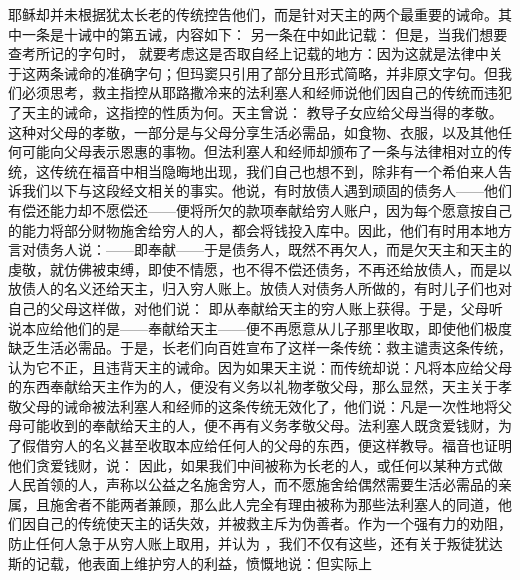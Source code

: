 耶稣却并未根据犹太长老的传统控告他们，而是针对天主的两个最重要的诫命。其中一条是十诫中的第五诫，内容如下： 另一条在中如此记载： 但是，当我们想要查考所记的字句时， 就要考虑这是否取自经上记载的地方：因为这就是法律中关于这两条诫命的准确字句；但玛窦只引用了部分且形式简略，并非原文字句。但我们必须思考，救主指控从耶路撒冷来的法利塞人和经师说他们因自己的传统而违犯了天主的诫命，这指控的性质为何。天主曾说： 教导子女应给父母当得的孝敬。这种对父母的孝敬，一部分是与父母分享生活必需品，如食物、衣服，以及其他任何可能向父母表示恩惠的事物。但法利塞人和经师却颁布了一条与法律相对立的传统，这传统在福音中相当隐晦地出现，我们自己也想不到，除非有一个希伯来人告诉我们以下与这段经文相关的事实。他说，有时放债人遇到顽固的债务人——他们有偿还能力却不愿偿还——便将所欠的款项奉献给穷人账户，因为每个愿意按自己的能力将部分财物施舍给穷人的人，都会将钱投入库中。因此，他们有时用本地方言对债务人说：——即奉献——于是债务人，既然不再欠人，而是欠天主和天主的虔敬，就仿佛被束缚，即使不情愿，也不得不偿还债务，不再还给放债人，而是以放债人的名义还给天主，归入穷人账上。放债人对债务人所做的，有时儿子们也对自己的父母这样做，对他们说： 即从奉献给天主的穷人账上获得。于是，父母听说本应给他们的是——奉献给天主——便不再愿意从儿子那里收取，即使他们极度缺乏生活必需品。于是，长老们向百姓宣布了这样一条传统：救主谴责这条传统，认为它不正，且违背天主的诫命。因为如果天主说：而传统却说：凡将本应给父母的东西奉献给天主作为的人，便没有义务以礼物孝敬父母，那么显然，天主关于孝敬父母的诫命被法利塞人和经师的这条传统无效化了，他们说：凡是一次性地将父母可能收到的奉献给天主的人，便不再有义务孝敬父母。法利塞人既贪爱钱财，为了假借穷人的名义甚至收取本应给任何人的父母的东西，便这样教导。福音也证明他们贪爱钱财，说： 因此，如果我们中间被称为长老的人，或任何以某种方式做人民首领的人，声称以公益之名施舍穷人，而不愿施舍给偶然需要生活必需品的亲属，且施舍者不能两者兼顾，那么此人完全有理由被称为那些法利塞人的同道，他们因自己的传统使天主的话失效，并被救主斥为伪善者。作为一个强有力的劝阻，防止任何人急于从穷人账上取用，并认为 ，我们不仅有这些，还有关于叛徒犹达斯的记载，他表面上维护穷人的利益，愤慨地说：但实际上 
